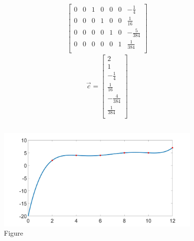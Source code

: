 \documentclass{article}
\begin{document}
{\begin{equation*}
\begin{split}
\begin{bmatrix}
                            0&0&1&0&0&0&-\frac{1}{4}\\
                            0&0&0&1&0&0&\frac{1}{16}\\
                            0&0&0&0&1&0&-\frac{5}{384}\\
                            0&0&0&0&0&1&\frac{1}{384}\\
                        \end{bmatrix}
                    \end{split}
                \end{equation*}
                \begin{equation*}
                    \vec{c}=
                    \begin{bmatrix}
                        2\\1\\-\frac{1}{4}\\\frac{1}{16}\\-\frac{4}{384}\\\frac{1}{384}\\
                    \end{bmatrix}
                \end{equation*}
            }
        \subsection{}
            
            \begin{figure}[H] 
                \centering 
                \includegraphics[width=0.9\textwidth]{img/Assignement_5_1.jpg}
                \caption{Figure} 
            \end{figure}
            
    \section{}
\end{document}
